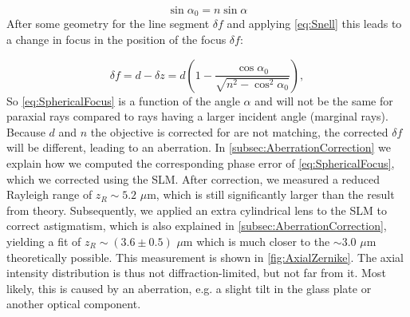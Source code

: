\begin{equation}\label{eq:Snell}
    \sin{\alpha_0} = n \sin{\alpha}
\end{equation}
After some geometry for the line segment $\delta f$ and applying \cref{eq:Snell} this leads to a change in focus in the position of the focus $\delta f$:

\begin{equation}\label{eq:SphericalFocus}
   \delta f = d - \delta z =
   d\left(1-\frac{\cos{\alpha_0}}{\sqrt{n^2-\cos^2{\alpha_0}}}\right),
\end{equation}
So \cref{eq:SphericalFocus} is a function of the angle $\alpha$ and will not be the same for paraxial rays compared to rays having a larger incident angle (marginal rays). 
Because $d$ and $n$ the objective is corrected for are not matching, the corrected $\delta f$ will be different, leading to an aberration. 
In \cref{subsec:AberrationCorrection} we explain how we computed the corresponding phase error of \cref{eq:SphericalFocus}, which we corrected using the \ac{SLM}.
After correction, we measured a reduced Rayleigh range of $z_R \sim 5.2$ $\mu$m, which is still significantly larger than the result from theory. 
Subsequently, we applied an extra cylindrical lens to the SLM to correct astigmatism, which is also explained in \cref{subsec:AberrationCorrection}, yielding a fit of $z_R \sim (3.6 \pm 0.5)$ $\mu$m which is much closer to the $\sim 3.0$ $\mu$m theoretically possible.
This measurement is shown in \cref{fig:AxialZernike}.
The axial intensity distribution is thus not diffraction-limited, but not far from it. 
Most likely, this is caused by an aberration, e.g. a slight tilt in the glass plate or another optical component.




















